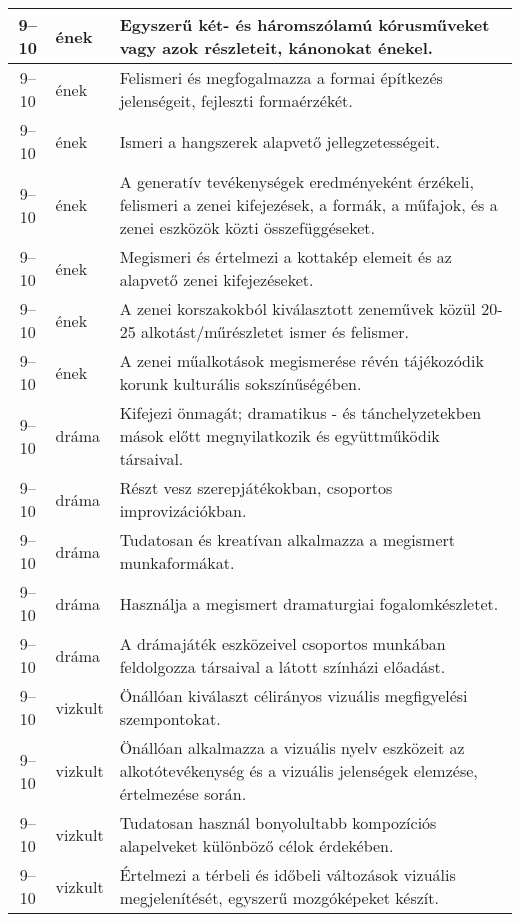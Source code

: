 \begin{small}
\begin{longtable}{c | p{2cm} |  p{11cm} }
              9--10 & ének & Egyszerű két- és háromszólamú kórusműveket vagy azok részleteit, kánonokat énekel. \\ \hline
              9--10 & ének & Felismeri és megfogalmazza a formai építkezés jelenségeit, fejleszti formaérzékét. \\ \hline
              9--10 & ének & Ismeri a hangszerek alapvető jellegzetességeit. \\ \hline
              9--10 & ének & A generatív tevékenységek eredményeként érzékeli, felismeri a zenei kifejezések, a formák, a műfajok, és a zenei eszközök közti összefüggéseket. \\ \hline
              9--10 & ének & Megismeri és értelmezi a kottakép elemeit és az alapvető zenei kifejezéseket. \\ \hline
              9--10 & ének & A zenei korszakokból kiválasztott zeneművek közül 20-25 alkotást/műrészletet ismer és felismer. \\ \hline
              9--10 & ének & A zenei műalkotások megismerése révén tájékozódik korunk kulturális sokszínűségében. \\ \hline
              9--10 & dráma & Kifejezi önmagát; dramatikus - és tánchelyzetekben mások előtt megnyilatkozik és együttműködik társaival. \\ \hline
              9--10 & dráma & Részt vesz szerepjátékokban, csoportos improvizációkban. \\ \hline
              9--10 & dráma & Tudatosan és kreatívan alkalmazza a megismert munkaformákat. \\ \hline
              9--10 & dráma & Használja a megismert dramaturgiai fogalomkészletet. \\ \hline
              9--10 & dráma & A drámajáték eszközeivel csoportos munkában feldolgozza társaival a látott színházi előadást. \\ \hline
              9--10 & vizkult & Önállóan kiválaszt célirányos vizuális megfigyelési szempontokat. \\ \hline
              9--10 & vizkult & Önállóan alkalmazza a vizuális nyelv eszközeit az alkotótevékenység és a vizuális jelenségek elemzése, értelmezése során. \\ \hline
              9--10 & vizkult & Tudatosan használ bonyolultabb kompozíciós alapelveket különböző célok érdekében. \\ \hline
              9--10 & vizkult & Értelmezi a térbeli és időbeli változások vizuális megjelenítését, egyszerű mozgóképeket készít. \\ \hline

\end{longtable}
\end{small}
